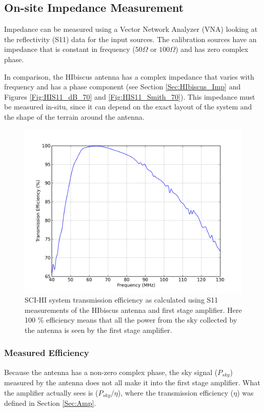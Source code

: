 \subsection{On-site Impedance Measurement}
Impedance can be measured using a Vector Network Analyzer (VNA) looking at the reflectivity (S11) data for the input sources. The calibration sources have an impedance that is constant in frequency ($50 \Omega$ or $100 \Omega$) and has zero complex phase.

In comparison, the HIbiscus antenna has a complex impedance that varies with frequency and has a phase component (see Section \ref{Sec:HIbiscus_Imp} and Figures \ref{Fig:HIS11_dB_70} and \ref{Fig:HIS11_Smith_70}). This impedance must be measured in-situ, since it can depend on the exact layout of the system and the shape of the terrain around the antenna. 

\begin{figure}[htb]
\begin{center}
\includegraphics[width=0.9\linewidth]{Data_analysis/figures/old_ant_efficiency.png}
\caption{SCI-HI system transmission efficiency as calculated using S11 measurements of the HIbiscus antenna and first stage amplifier. Here 100 \% efficiency means that all the power from the sky collected by the antenna is seen by the first stage amplifier. }
\label{Fig:eff}
\end{center}
\end{figure}

\subsubsection{Measured Efficiency}
Because the antenna has a non-zero complex phase, the sky signal ($P_{sky}$) measured by the antenna does not all make it into the first stage amplifier. What the amplifier actually sees is ($P_{sky}/\eta$), where the transmission efficiency ($\eta$) was defined in Section \ref{Sec:Amp}. 

